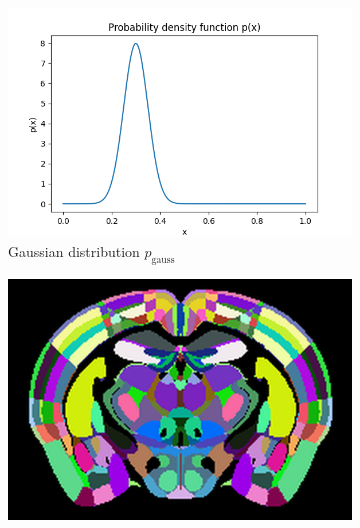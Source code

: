 \documentclass[]{article}
\begin{document}
\begin{figure}
	\begin{subfigure}{0.3\textwidth}
		\centering
		\includegraphics[width=1.1\linewidth]{plotted_figures/small_noise_density_function.png}
		\caption{Gaussian distribution $p_\text{gauss}$}
		\label{fig:gauss_distribution}
	\end{subfigure}
	\begin{subfigure}{0.3\textwidth}
		\centering
		\includegraphics[width=0.95\linewidth]{../results/random_noise__ano_coronal_50_res_slice_1.png}
		\caption{}
	\end{subfigure}
	\begin{subfigure}{0.3\textwidth}
		\centering

\end{subfigure}
\end{figure}
\end{document}
